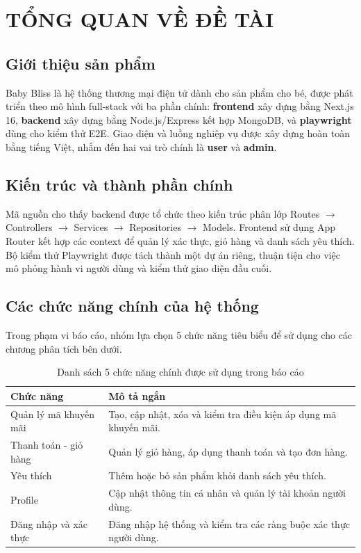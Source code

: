 
\newpage

\section{\textbf{TỔNG QUAN VỀ ĐỀ TÀI}}

\subsection{Giới thiệu sản phẩm}
Baby Bliss là hệ thống thương mại điện tử dành cho sản phẩm cho bé, được phát triển theo mô hình full-stack với ba phần chính: \textbf{frontend} xây dựng bằng Next.js 16, \textbf{backend} xây dựng bằng Node.js/Express kết hợp MongoDB, và \textbf{playwright} dùng cho kiểm thử E2E. Giao diện và luồng nghiệp vụ được xây dựng hoàn toàn bằng tiếng Việt, nhắm đến hai vai trò chính là \textbf{user} và \textbf{admin}.

\subsection{Kiến trúc và thành phần chính}
Mã nguồn cho thấy backend được tổ chức theo kiến trúc phân lớp Routes $\rightarrow$ Controllers $\rightarrow$ Services $\rightarrow$ Repositories $\rightarrow$ Models. Frontend sử dụng App Router kết hợp các context để quản lý xác thực, giỏ hàng và danh sách yêu thích. Bộ kiểm thử Playwright được tách thành một dự án riêng, thuận tiện cho việc mô phỏng hành vi người dùng và kiểm thử giao diện đầu cuối.

\subsection{Các chức năng chính của hệ thống}
Trong phạm vi báo cáo, nhóm lựa chọn 5 chức năng tiêu biểu để sử dụng cho các chương phân tích bên dưới.

\begin{table}[H]
	\centering
	\small
	\renewcommand{\arraystretch}{1.3}
	\begin{tabularx}{\textwidth}{|>{\raggedright\arraybackslash}p{4.6cm}|>{\raggedright\arraybackslash}X|}
		\hline
		\textbf{Chức năng}    & \textbf{Mô tả ngắn}                                               \\
		\hline
		Quản lý mã khuyến mãi & Tạo, cập nhật, xóa và kiểm tra điều kiện áp dụng mã khuyến mãi.   \\
		\hline
		Thanh toán - giỏ hàng & Quản lý giỏ hàng, áp dụng thanh toán và tạo đơn hàng.             \\
		\hline
		Yêu thích             & Thêm hoặc bỏ sản phẩm khỏi danh sách yêu thích.                   \\
		\hline
		Profile               & Cập nhật thông tin cá nhân và quản lý tài khoản người dùng.       \\
		\hline
		Đăng nhập và xác thực & Đăng nhập hệ thống và kiểm tra các ràng buộc xác thực người dùng. \\
		\hline
	\end{tabularx}
	\caption{Danh sách 5 chức năng chính được sử dụng trong báo cáo}
	\label{tab:core-functions}
\end{table}
